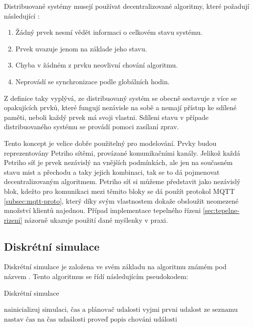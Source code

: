 Distribuované systémy musejí používat decentralizované algoritmy, které požadují následující \cite[p.20]{distributed_systems}:
\begin{enumerate}
  \item Žádný prvek nesmí vědět informaci o celkovém stavu systému.
  \item Prvek uvazuje jenom na základe jeho stavu.
  \item Chyba v žádném z prvku neovlivní chování algoritmu.
  \item Neprovádí se synchronizace podle globálních hodin.
\end{enumerate}

Z definice taky vyplývá, ze distribuovaný systém se obecně sestavuje z více se opakujících prvků, které fungují nezávisle na sobě a nemají přístup ke sdílené paměti, neboli každý prvek má svoji vlastni. Sdíleni stavu v případe distribuovaného systému se provádí pomoci zasílaní zprav.

Tento koncept je velice dobře použitelný pro modelování. Prvky budou reprezentovány Petriho sítěmi, provázané komunikačními kanály. Jelikož každá Petriho síť je prvek nezávislý na vnějších podmínkách, ale jen na současném stavu mist a přechodu a taky jejich kombinaci, tak se to dá pojmenovat decentralizovaným algoritmem. Petriho síť si můžeme představit jako nezávislý blok, kdežto pro komunikaci mezi těmito bloky se dá použít protokol MQTT \ref{subsec:mqtt-proto}, který díky svým vlastnostem dokaže obsloužit neomezené množství klientů najednou. Případ implementace tepelného řízeni \ref{sec:tepelne-rizeni} názorně ukazuje použití dané myšlenky v praxi.

\subsection{Diskrétní simulace}
\label{subsec:disc-sim}

Diskrétní simulace je založena ve svém základu na algoritmu známém pod názvem . Tento algoritmus se řídí následujícím pseudokodem:
\begin{algorithm}
 \caption{Diskrétní simulace}\label{disc-sim-alg}
 \begin{algorithmic}[1]
 \State $\text{nainicializuj simulaci, čas a plánovač udalosti}$
 \State $\text{vyjmi prvni udalost ze seznamu}$
   \Return
 \EndIf
 \State $\text{nastav čas na čas udaálosti}$
 \State $\text{proveď popis chováni události}$
 \EndWhile
 \end{algorithmic}
\end{algorithm}


